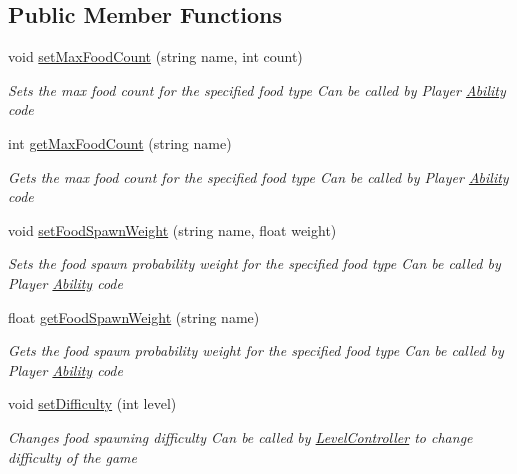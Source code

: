 \subsection*{Public Member Functions}
\begin{DoxyCompactItemize}
\item 
void \hyperlink{class_food_controller_a9f0f153ce5e90b4e081f4d903cf17808}{set\+Max\+Food\+Count} (string name, int count)
\begin{DoxyCompactList}\small\item\em Sets the max food count for the specified food type Can be called by Player \hyperlink{class_ability}{Ability} code \end{DoxyCompactList}\item 
int \hyperlink{class_food_controller_af9fcb378c2333de7796093ef368bfd93}{get\+Max\+Food\+Count} (string name)
\begin{DoxyCompactList}\small\item\em Gets the max food count for the specified food type Can be called by Player \hyperlink{class_ability}{Ability} code \end{DoxyCompactList}\item 
void \hyperlink{class_food_controller_ae118c67950b39a9b3aaa8e15f027a37b}{set\+Food\+Spawn\+Weight} (string name, float weight)
\begin{DoxyCompactList}\small\item\em Sets the food spawn probability weight for the specified food type Can be called by Player \hyperlink{class_ability}{Ability} code \end{DoxyCompactList}\item 
float \hyperlink{class_food_controller_aa210ae3e7b1cc83ba3dab4a36970e19f}{get\+Food\+Spawn\+Weight} (string name)
\begin{DoxyCompactList}\small\item\em Gets the food spawn probability weight for the specified food type Can be called by Player \hyperlink{class_ability}{Ability} code \end{DoxyCompactList}\item 
void \hyperlink{class_food_controller_a33196e4fa774e489de86cedaff452e83}{set\+Difficulty} (int level)
\begin{DoxyCompactList}\small\item\em Changes food spawning difficulty Can be called by \hyperlink{class_level_controller}{Level\+Controller} to change difficulty of the game \end{DoxyCompactList}\end{DoxyCompactItemize}
